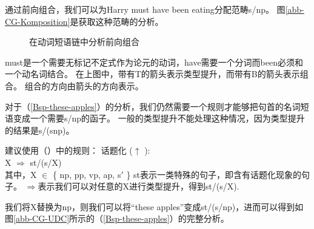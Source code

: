 通过前向组合，我们可以为Harry must have been eating分配范畴s/np。
图\vref{abb-CG-Komposition}是获取这种范畴的分析。
\begin{figure}
\centerline{%
}
\caption{\label{abb-CG-Komposition}在动词短语链中分析前向组合}
\end{figure}%
must是一个需要无标记不定式作为论元的动词，have需要一个分词而been必须和一个动名词结合。
在上图中，带有T的箭头表示类型提升，而带有B的箭头表示组合。
组合的方向由箭头的方向表示。

对于（\ref{Bsp-these-apples}）的分析，我们仍然需要一个规则才能够把句首的名词短语变成一个需要s/np的函子。
一般的类型提升不能处理这种情况，因为类型提升的结果是s/(s\bs np)。

\citet[]{Steedman89a}建议使用（）中的规则：
\ea
\label{Regel-Topikalisierung}
话题化
 ($\uparrow$
\isc{$\uparrow$}
\is{$\uparrow$}):\\
X $\Rightarrow$ st/(s/X)\\
其中，X $\in$ \{ np, pp, vp, ap, s$'$ \}
\z
st表示一类特殊的句子，即含有话题化现象的句子。
$\Rightarrow$表示我们可以对任意的X进行类型提升，得到st/(s/X). 

我们将X替换为np，则我们可以将“these apples”变成st/(s/np)，进而可以得到如图\vref{abb-CG-UDC}所示的（\ref{Bsp-these-apples}）的完整分析。

